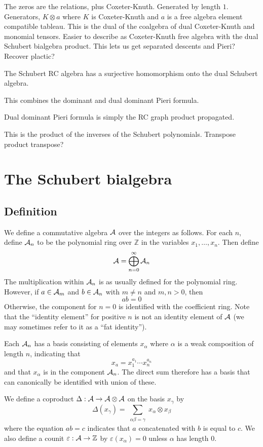 \documentclass{elsarticle}
\theoremstyle{definition}
\theoremstyle{remark}
\numberwithin{equation}{subsection}
\begin{document}
The zeros are the relations, plus Coxeter-Knuth. Generated by length $1$. Generators, $K\otimes a$ where $K$ is Coxeter-Knuth and $a$ is a free algebra element compatible tableau. This is the dual of the coalgebra of dual Coxeter-Knuth and monomial tensors. Easier to describe as Coxeter-Knuth free algebra with the dual Schubert bialgebra product. This lets us get separated descents and Pieri? Recover plactic?

The Schubert RC algebra has a surjective homomorphism onto the dual Schubert algebra.

This combines the dominant and dual dominant Pieri formula.

Dual dominant Pieri formula is simply the RC graph product propagated.

This is the product of the inverses of the Schubert polynomials. Transpose product transpose?



\section{The Schubert bialgebra}

\subsection{Definition}

We define a commutative algebra $\mathcal{A}$ over the integers as follows. For each $n$, define $\mathcal{A}_n$ to be the polynomial ring over $\mathbb{Z}$ in the variables $x_1,\ldots,x_n$. Then define
$$\mathcal{A} =\bigoplus_{n=0}^\infty \mathcal{A}_n$$
The multiplication within $\mathcal{A}_n$ is as usually defined for the polynomial ring. However, if $a\in \mathcal{A}_m$ and $b\in \mathcal{A}_n$ with $m\neq n$ and $m,n>0$,  then
$$ab = 0$$
Otherwise, the component for $n=0$ is identified with the coefficient ring. Note that the ``identity element'' for positive $n$ is not an identity element of $\mathcal{A}$ (we may sometimes refer to it as a ``fat identity''). 

Each $\mathcal{A}_n$ has a basis consisting of elements $x_{\alpha}$ where $\alpha$ is a weak composition of length $n$, indicating that
$$x_a = x_1^{a_1}\cdots x_n^{a_n}$$
and that $x_\alpha$ is in the component $\mathcal{A}_n$. The direct sum therefore has a basis that can canonically be identified with union of these.

We define a coproduct $\Delta:\mathcal{A}\to\mathcal{A}\otimes\mathcal{A}$ on the basis $x_\gamma$ by
$$\Delta(x_\gamma) = \sum_{\substack{\alpha\beta=\gamma}} x_\alpha\otimes x_\beta$$
where the equation $ab=c$ indicates that $a$ concatenated with $b$ is equal to $c$. We also define a counit $\varepsilon:\mathcal{A}\to \mathbb{Z}$ by $\varepsilon(x_\alpha)=0$ unless $\alpha$ has length $0$.
\end{document}
